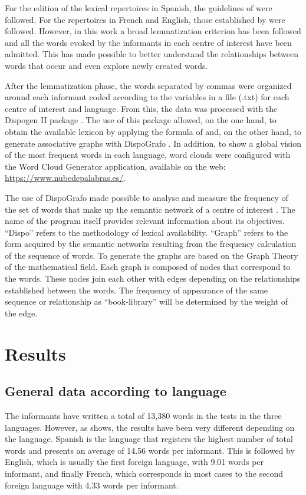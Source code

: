 \documentclass[english]{textolivre}
\begin{document}
For the edition of the lexical repertoires in Spanish, the guidelines of \textcite{samper-padilla_proyecto_2003} were followed. For the repertoires in French and English, those established by \textcite{de_la_maya_retamar_desarrollo_2015,mackey_vocabulaire_1971,santos_diaz_activacion_2020} were followed. However, in this work a broad lemmatization criterion has been followed and all the words evoked by the informants in each centre of interest have been admitted. This has made possible to better understand the relationships between words that occur and even explore newly created words.

After the lemmatization phase, the words separated by commas were organized around each informant coded according to the variables in a file (.txt) for each centre of interest and language. From this, the data was processed with the Dispogen II package \cite{echeverria_dispogen_2005}. The use of this package allowed, on the one hand, to obtain the available lexicon by applying the formula of \textcite{lopez-chavez_otro_1978} and, on the other hand, to generate associative graphs with DispoGrafo \cite{echeverria_dispografo:_2008}. In addition, to show a global vision of the most frequent words in each language, word clouds were configured with the Word Cloud Generator application, available on the web: \url{https://www.nubedepalabras.es/}.

The use of DispoGrafo made possible to analyse and measure the frequency of the set of words that make up the semantic network of a centre of interest \cite{collins_retrieval_1969,steyvers_large-scale_2005}. The name of the program itself provides relevant information about its objectives. “Dispo” refers to the methodology of lexical availability. “Graph” refers to the form acquired by the semantic networks resulting from the frequency calculation of the sequence of words. To generate the graphs \textcite{echeverria_dispografo:_2008} are based on the Graph Theory of the mathematical field. Each graph is composed of nodes that correspond to the words. These nodes join each other with edges depending on the relationships established between the words. The frequency of appearance of the same sequence or relationship as “book-library” will be determined by the weight of the edge.


\section{Results}\label{sec-modelo}

\subsection{General data according to language}
The informants have written a total of 13,380 words in the tests in the three languages. However, as  shows, the results have been very different depending on the language. Spanish is the language that registers the highest number of total words and presents an average of 14.56 words per informant. This is followed by English, which is usually the first foreign language, with 9.01 words per informant, and finally French, which corresponds in most cases to the second foreign language with 4.33 words per informant.
\end{document}
